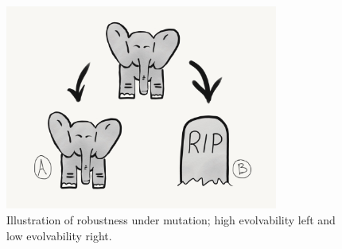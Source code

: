 \begin{figure}
    \centering
    \includegraphics[width=0.8\textwidth]{img/robustness}
 	\captionsetup{singlelinecheck=off,justification=raggedright}
  	\caption{Illustration of robustness under mutation; high evolvability left and low evolvability right.}
    \label{fig:robustness}
\end{figure}
